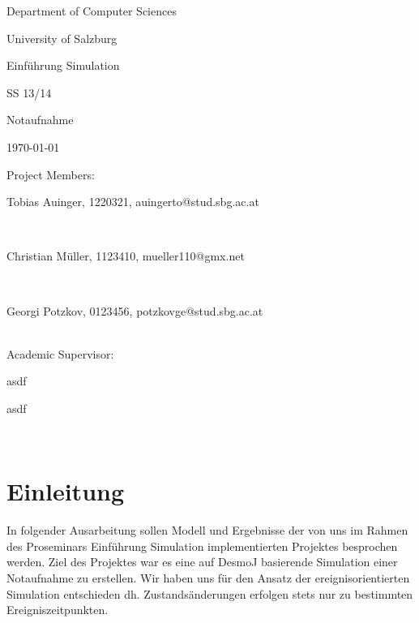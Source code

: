 \documentclass[12pt,fleqn,a4paper]{article}
\begin{document}
\begin{titlepage}%
\vspace{2cm}
\centerline{
\large{Department of Computer Sciences}}
\vspace{0.2cm}
\centerline{\large{University of Salzburg}}%
\vspace{2cm}

\centerline{\large{Einf\"{u}hrung Simulation}}
\centerline{SS 13/14}
\vspace{1cm}

\centerline{\huge{Notaufnahme}}
\vspace{1cm}

\vspace{0.4cm}%
\centerline{\today}
\vspace{5cm}%

\vspace{0.2cm}
Project Members:\\
\centerline{Tobias Auinger, 1220321, auingerto@stud.sbg.ac.at}\\
\centerline{Christian M\"{u}ller, 1123410, mueller110@gmx.net}\\
\centerline{Georgi Potzkov, 0123456, potzkovge@stud.sbg.ac.at}
\vspace {0.8cm}\\

Academic Supervisor: \\
\centerline{asdf}
\centerline{asdf}
\vspace{0.8cm}\\
\clearpage
\end{titlepage}


\clearpage
\pagestyle{headings}
\setcounter{page}{1}
\setcounter{page}{1}

\tableofcontents
\newpage

\section{Einleitung}
In folgender Ausarbeitung sollen  Modell und Ergebnisse der von uns im Rahmen des Proseminars Einf\"{u}hrung Simulation implementierten Projektes besprochen werden.
Ziel des Projektes war es eine auf DesmoJ basierende Simulation einer Notaufnahme zu erstellen. Wir haben uns f\"{u}r den Ansatz der ereignisorientierten Simulation entschieden dh. Zustands\"{a}nderungen erfolgen stets nur zu bestimmten Ereigniszeitpunkten.
\end{document}
